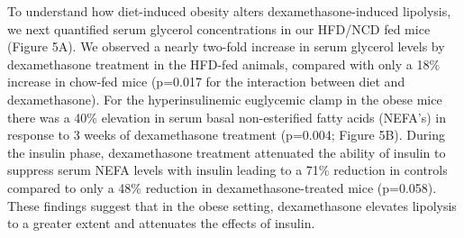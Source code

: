 \documentclass[11pt]{article} %
\begin{document}
To understand how diet-induced obesity alters dexamethasone-induced
lipolysis, we next quantified serum glycerol concentrations in our
HFD/NCD fed mice (Figure 5A). We observed a nearly two-fold increase in
serum glycerol levels by dexamethasone treatment in the HFD-fed animals,
compared with only a 18\% increase in chow-fed mice (p=0.017 for the
interaction between diet and dexamethasone). For the hyperinsulinemic
euglycemic clamp in the obese mice there was a 40\% elevation in serum
basal non-esterified fatty acids (NEFA's) in response to 3 weeks of
dexamethasone treatment (p=0.004; Figure 5B). During the insulin phase,
dexamethasone treatment attenuated the ability of insulin to suppress
serum NEFA levels with insulin leading to a 71\% reduction in controls
compared to only a 48\% reduction in dexamethasone-treated mice
(p=0.058). These findings suggest that in the obese setting,
dexamethasone elevates lipolysis to a greater extent and attenuates the
effects of insulin.
\end{document}
